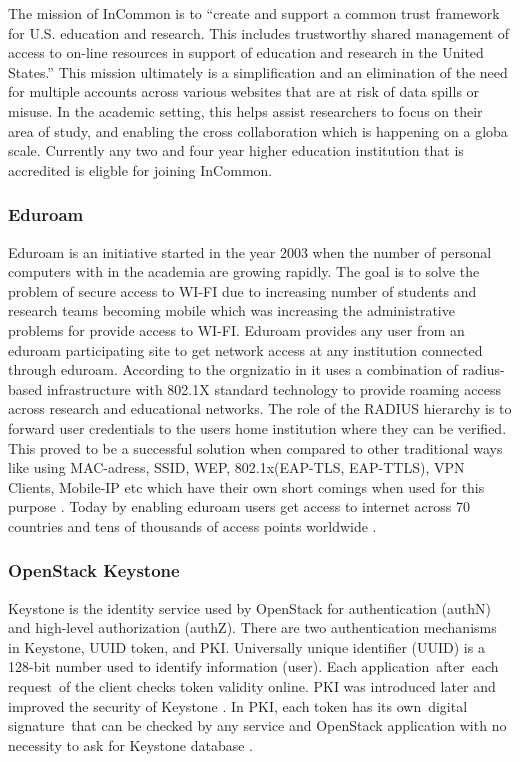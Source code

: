 {     The mission of InCommon is to ``create and support a common trust
     framework for U.S. education and research.  This includes
     trustworthy shared management of access to on-line resources in
     support of education and research in the United
     States.'' \cite{www-incommon} This mission ultimately is a
     simplification and an elimination of the need for multiple
     accounts across various websites that are at risk of data spills
     or misuse.  In the academic setting, this helps assist
     researchers to focus on their area of study, and enabling the
     cross collaboration which is happening on a globa scale.
     Currently any two and four year higher education institution that
     is accredited is eligble for joining InCommon.

\subsubsection{Eduroam}

     Eduroam is an initiative started in the year 2003 when the number
     of personal computers with in the academia are growing
     rapidly. The goal is to solve the problem of secure access to
     WI-FI due to increasing number of students and research teams
     becoming mobile which was increasing the administrative problems
     for provide access to WI-FI. Eduroam provides any user from an
     eduroam participating site to get network access at any
     institution connected through eduroam. According to the
     orgnizatio in it uses a combination of radius-based infrastructure
     with 802.1X standard technology to provide roaming access across
     research and educational networks. The role of the RADIUS
     hierarchy is to forward user credentials to the users home
     institution where they can be verified. This proved to be a
     successful solution when compared to other traditional ways like
     using MAC-adress, SSID, WEP, 802.1x(EAP-TLS, EAP-TTLS), VPN
     Clients, Mobile-IP etc which have their own short comings when
     used for this purpose \cite{eduroam-paper-2005}. Today by
     enabling eduroam users get access to internet across 70 countries
     and tens of thousands of access points worldwide \cite{www-eduroam}.


\subsubsection{OpenStack Keystone \cv}

     \cite{www-keystone-wiki} Keystone is the identity service used
     by OpenStack for authentication (authN) and high-level
     authorization (authZ).  There are two authentication mechanisms
     in Keystone, UUID token, and PKI.  Universally unique identifier
     (UUID) is a 128-bit number used to identify information
     (user). Each application after each request of the client checks
     token validity online. PKI was introduced later and improved the
     security of Keystone \cite{cui2015security}. In PKI, each token
     has its own digital signature that can be checked by any service
     and OpenStack application with no necessity to ask for Keystone
     database \cite{www-cloudberrylab-kstn}.
 
}
